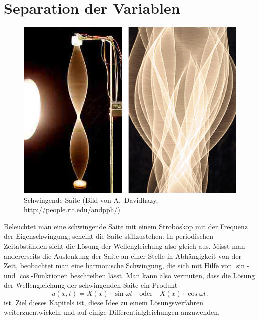 %
%
%
\rhead{}
\chapter{Separation der Variablen\label{chapter-separation}}
\begin{figure}
\begin{center}
\includegraphics[width=0.8\hsize]{../common/graphics/stringvibrlarge-10-06-06.jpg}
\end{center}
\caption{Schwingende Saite (Bild von A.~Davidhazy, http://people.rit.edu/andpph/)
\label{separation:schwingendesaite}}
\end{figure}
Beleuchtet man eine schwingende Saite mit einem Stroboskop mit der
Frequenz der Eigenschwingung, scheint die Saite stillzustehen. 
In periodischen Zeit\-ab\-stän\-den sieht die Lösung der Wellengleichung
also gleich aus.
Misst man andererseits die Auslenkung der Saite
an einer Stelle in Abhängigkeit von der Zeit, beobachtet man
eine harmonische Schwingung, die sich mit Hilfe von $\sin$- und
$\cos$-Funktionen beschreiben lässt. Man kann also vermuten,
dass die Lösung der Wellengleichung der schwingenden Saite
ein Produkt
\[
u(x,t)=X(x)\cdot\sin\omega t\quad\text{oder}\quad X(x)\cdot\cos\omega t.
\]
ist. Ziel dieses Kapitels ist, diese Idee zu einem Lösungsverfahren
weiterzuentwickeln und auf einige Differentialgleichungen anzuwenden.









